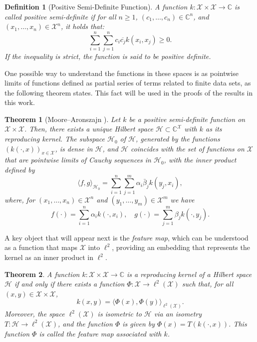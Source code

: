 \documentclass{article}
\newtheorem{defn}{Definition}
\newtheorem{theo}{Theorem}
\renewcommand{\H}{\mathcal{H}}
\newcommand{\X}{\mathcal{X}}
\begin{document}
\begin{defn}[Positive Semi-Definite Function]
A function \( k: \X \times \X \to \mathbb{C} \) is called positive semi-definite if for all \( n \geq 1 \), \( (c_1, \dots, c_n) \in \mathbb{C}^n \), and \( (x_1, \dots, x_n) \in \X^n \), it holds that:
\[
\sum_{i=1}^n \sum_{j=1}^n c_i \overline{c_j} k(x_i, x_j) \geq 0.
\]
If the inequality is strict, the function is said to be positive definite.
\end{defn}

One possible way to understand the functions in these spaces is as pointwise limits of functions defined as partial series of terms related to finite data sets, as the following theorem states. This fact will be used in the proofs of the results in this work.

\begin{theo}[Moore–Aronszajn \cite{Aronszajn1950TheoryKernels}]
Let \( k \) be a positive semi-definite function on \( \X \times \X \). Then, there exists a unique Hilbert space \( \H \subset \mathbb{C}^{\X} \) with \( k \) as its \textit{reproducing kernel}. The subspace \( \H_0 \) of \( \H \), generated by the functions \( (k(\cdot, x))_{x \in \X} \), is dense in \( \H \), and \( \H \) coincides with the set of functions on \( \X \) that are pointwise limits of Cauchy sequences in \( \H_0 \), with the inner product defined by
\[
\langle f, g \rangle_{\H_0} = \sum_{i=1}^n \sum_{j=1}^m \alpha_i \bar{\beta}_j k(y_j, x_i),
\]
where, for \( (x_1, \dots, x_n) \in \X^n \) and \( (y_1, \dots, y_m) \in \X^m \) we have
\[
 f(\cdot) = \sum_{i=1}^n \alpha_i k(\cdot, x_i), \quad g(\cdot) = \sum_{j=1}^m \beta_j k(\cdot, y_j).
\]

\end{theo}

A key object that will appear next is the \textit{feature map}, which can be understood as a function that maps $\X$ into $\ell^2$, providing an embedding that represents the kernel as an inner product in $\ell^2$.

\begin{theo}
A function \( k: \X \times \X \to \mathbb{C} \) is a \textit{reproducing kernel} of a Hilbert space \( \H \) if and only if there exists a function \( \Phi: \X \to \ell^2(\X) \) such that, for all \( (x, y) \in \X \times \X \),
\[
k(x, y) = \langle \Phi(x), \Phi(y) \rangle_{\ell^2(\X)}.
\]
Moreover, the space \( \ell^2(\X) \) is isometric to \( \H \) via an isometry \( T: \H \to \ell^2(\X) \), and the function \( \Phi \) is given by \( \Phi(x) = T(k(\cdot, x)) \). This function \( \Phi \) is called the \textit{feature map} associated with \( k \).
\end{theo}
\end{document}
